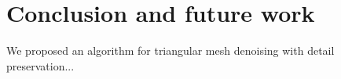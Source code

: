 \chapter{Conclusion and future work}
\label{cha:Conclusion}

We proposed an algorithm for triangular mesh denoising with detail preservation...

